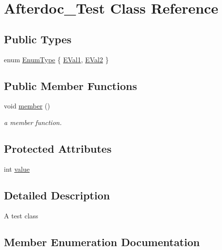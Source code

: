 \hypertarget{classAfterdoc__Test}{}\section{Afterdoc\+\_\+\+Test Class Reference}
\label{classAfterdoc__Test}
\subsection*{Public Types}
\begin{DoxyCompactItemize}
\item 
enum \hyperlink{classAfterdoc__Test_adab0cd7ad3b4875e245ca8f6238a388a}{Enum\+Type} \{ \hyperlink{classAfterdoc__Test_adab0cd7ad3b4875e245ca8f6238a388aae054276790e35692ad0abe10c5b75da4}{E\+Val1}, 
\hyperlink{classAfterdoc__Test_adab0cd7ad3b4875e245ca8f6238a388aac849f37624d8d2d68ca72c4a8df9cf99}{E\+Val2}
 \}
\end{DoxyCompactItemize}
\subsection*{Public Member Functions}
\begin{DoxyCompactItemize}
\item 
void \hyperlink{classAfterdoc__Test_a57ba94e9039ee90a1b191ae0009a05dd}{member} ()\hypertarget{classAfterdoc__Test_a57ba94e9039ee90a1b191ae0009a05dd}{}\label{classAfterdoc__Test_a57ba94e9039ee90a1b191ae0009a05dd}

\begin{DoxyCompactList}\small\item\em a member function. \end{DoxyCompactList}\end{DoxyCompactItemize}
\subsection*{Protected Attributes}
\begin{DoxyCompactItemize}
\item 
int \hyperlink{classAfterdoc__Test_a9287a08830e5cdfd9c732bb7932694a0}{value}
\end{DoxyCompactItemize}


\subsection{Detailed Description}
A test class 

\subsection{Member Enumeration Documentation}
